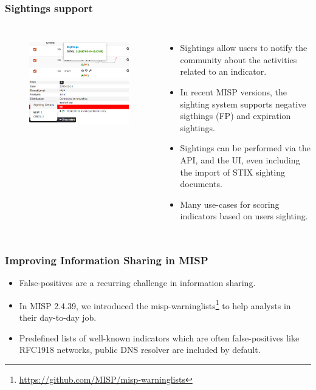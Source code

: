 \begin{frame}
        \frametitle{Sightings support}
        \begin{columns}[t]
        \column{5.0cm}
        \begin{figure}
        \includegraphics[scale=0.3]{screenshots/sighting-n.png}\\
        \includegraphics[scale=0.34]{screenshots/Sightings2.PNG}
        \end{figure}
        \column{7cm}
        \begin{itemize}
                \item Sightings allow users to notify the community about the activities related to an indicator.
                \item In recent MISP versions, the sighting system supports negative sigthings (FP) and expiration sightings.
                \item Sightings can be performed via the API, and the UI, even including the import of STIX sighting documents.
                \item Many use-cases for scoring indicators based on users sighting.
        \end{itemize}
        \end{columns}
\end{frame}


\begin{frame}
\frametitle{Improving Information Sharing in MISP}
\begin{itemize}
        \item False-positives are a recurring challenge in information sharing.
        \item In MISP 2.4.39, we introduced the misp-warninglists\footnote{\url{https://github.com/MISP/misp-warninglists}} to help analysts in their day-to-day job.
        \item Predefined lists of well-known indicators which are often false-positives like RFC1918 networks, public DNS resolver are included by default.
\end{itemize}
\end{frame}

